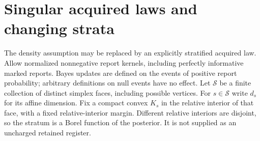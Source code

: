\section{Singular acquired laws and changing strata}\label{sec:strata}
The density assumption may be replaced by an explicitly stratified acquired law. Allow normalized nonnegative report kernels, including perfectly informative marked reports. Bayes updates are defined on the events of positive report probability; arbitrary definitions on null events have no effect. Let $\mathcal S$ be a finite collection of distinct simplex faces, including possible vertices. For $s\in\mathcal S$ write $d_s$ for its affine dimension. Fix a compact convex $K_s$ in the relative interior of that face, with a fixed relative-interior margin. Different relative interiors are disjoint, so the stratum is a Borel function of the posterior. It is not supplied as an uncharged retained register.

